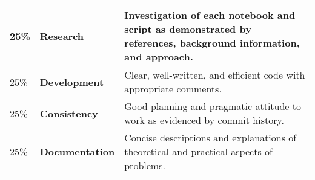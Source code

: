 \documentclass[12pt, a4paper, hidelinks]{scrartcl}
\begin{document}
  \begin{center}
    \begin{tabular}{llp{8.4cm}}
      \toprule
      25\% & \textbf{Research} & Investigation of each notebook and script as demonstrated by references, background information, and approach. \\
      \midrule
      25\% & \textbf{Development} & Clear, well-written, and efficient code with appropriate comments. \\
      \midrule
      25\% & \textbf{Consistency} & Good planning and pragmatic attitude to work as evidenced by commit history. \\
      \midrule
      25\% & \textbf{Documentation} & Concise descriptions and explanations of theoretical and practical aspects of problems. \\
      \bottomrule
    \end{tabular}
  \end{center}
\end{document}
